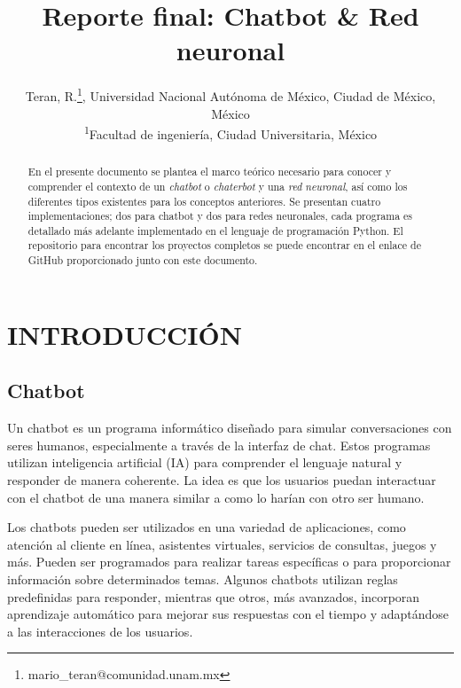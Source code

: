 \documentclass[a4paper,
               ]{jacow}
\begin{document}
\title{Reporte final: Chatbot \& Red neuronal}

\author{Teran, R.\thanks{mario\_teran@comunidad.unam.mx}, Universidad Nacional Autónoma de México, Ciudad de México, México \\
		\textsuperscript{1}Facultad de ingeniería, Ciudad Universitaria, México}
	
\maketitle
\begin{abstract}
    En el presente documento se plantea el marco teórico necesario para conocer y comprender el contexto de un \textit{chatbot} o \textit{chaterbot} y una \textit{red} \textit{neuronal}, así como los diferentes tipos existentes para los conceptos anteriores. Se presentan cuatro implementaciones; dos para chatbot y dos para redes neuronales, cada programa es detallado más adelante implementado en el lenguaje de programación Python. El repositorio para encontrar los proyectos completos se puede encontrar en el enlace de GitHub proporcionado junto con este documento. 
\end{abstract}

\section{INTRODUCCIÓN}
\subsection{Chatbot}
Un chatbot es un programa informático diseñado para simular conversaciones con seres humanos, especialmente a través de la interfaz de chat. Estos programas utilizan inteligencia artificial (IA) para comprender el lenguaje natural y responder de manera coherente. La idea es que los usuarios puedan interactuar con el chatbot de una manera similar a como lo harían con otro ser humano.

Los chatbots pueden ser utilizados en una variedad de aplicaciones, como atención al cliente en línea, asistentes virtuales, servicios de consultas, juegos y más. Pueden ser programados para realizar tareas específicas o para proporcionar información sobre determinados temas. Algunos chatbots utilizan reglas predefinidas para responder, mientras que otros, más avanzados, incorporan aprendizaje automático para mejorar sus respuestas con el tiempo y adaptándose a las interacciones de los usuarios.
\end{document}
